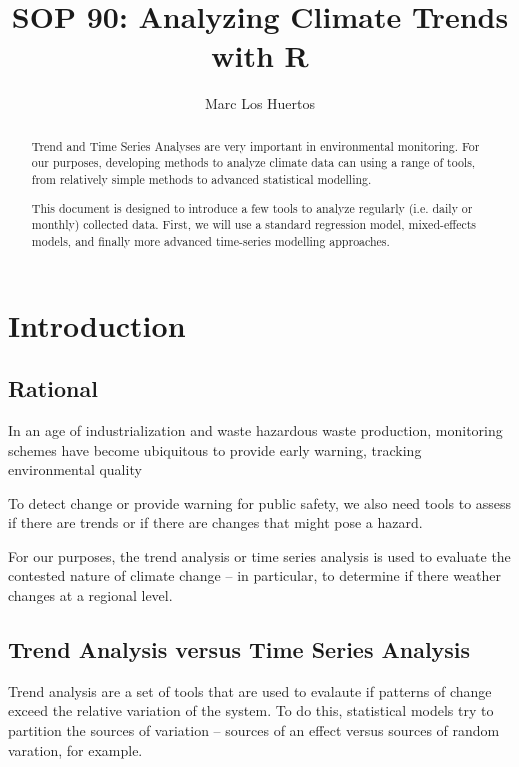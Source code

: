 \documentclass{article}\usepackage[]{graphicx}\usepackage[]{color}
\title{SOP 90: Analyzing Climate Trends with R}
\author{Marc Los Huertos}
\begin{document}
\maketitle
\tableofcontents

\begin{abstract}
\noindent Trend and Time Series Analyses are very important in environmental monitoring. For our purposes, developing methods to analyze climate data can using a range of tools, from relatively simple methods to advanced statistical modelling. 

This document is designed to introduce a few tools to analyze regularly (i.e. daily or monthly) collected data. First, we will use a standard regression model, mixed-effects models, and finally more advanced time-series modelling approaches.   

\end{abstract}


\section{Introduction}

\subsection{Rational}

In an age of industrialization and waste hazardous waste production, monitoring schemes have become ubiquitous to provide early warning, tracking environmental quality 

To detect change or provide warning for public safety, we also need tools to assess if there are trends or if there are changes that might pose a hazard.

For our purposes, the trend analysis or time series analysis is used to evaluate the contested nature of climate change -- in particular, to determine if there weather changes at a regional level. 

\subsection{Trend Analysis versus Time Series Analysis}

Trend analysis are a set of tools that are used to evalaute if patterns of change exceed the relative variation of the system. To do this, statistical models try to partition the sources of variation -- sources of an effect versus sources of random varation, for example.
\end{document}
